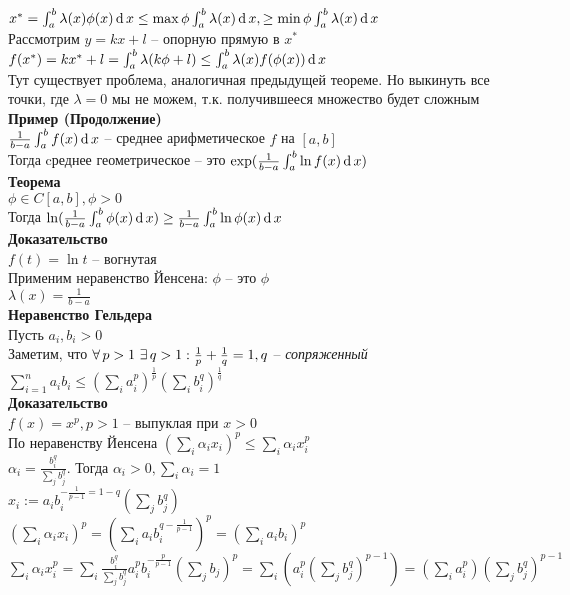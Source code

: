 \documentclass[12pt]{article}
\begin{document}
$x^* = \int_a^b \lambda(x)\phi(x)\operatorname{d} x \leq \max \phi \int_a^b \lambda(x)\operatorname{d} x, \geq \min \phi \int_a^b \lambda(x)\operatorname{d} x$\\
Рассмотрим $y=kx+l$ -- опорную прямую в $x^*$\\
$f(x^*) = kx^*+l = \int_a^b \lambda(k\phi + l) \leq \int_a^b \lambda(x)f(\phi(x)) \operatorname{d} x$\\
Тут существует проблема, аналогичная предыдущей теореме. Но выкинуть все точки, где $\lambda = 0$ мы не можем, т.к. получившееся множество будет сложным\\
\textbf{Пример (Продолжение)}\\
$\frac1{b-a}\int_a^b f(x)\operatorname{d} x$ -- среднее арифметическое $f$ на $[a,b]$\\
Тогда cреднее геометрическое -- это $\exp (\frac1{b-a}\int_a^b \ln f(x) \operatorname{d} x)$\\
\textbf{Теорема}\\
$\phi \in C[a,b], \phi > 0$\\
Тогда $\ln (\frac1{b-a}\int_a^b \phi(x)\operatorname{d} x) \geq \frac1{b-a}\int_a^b \ln \phi(x) \operatorname{d} x$\\
\textbf{Доказательство}\\
$f(t) = \ln t$ -- вогнутая\\
Применим неравенство Йенсена: $\phi$ -- это $\phi$\\
$\lambda(x) = \frac1{b-a}$\\
\textbf{Неравенство Гельдера}\\
Пусть $a_i, b_i > 0$\\
Заметим, что $\forall\, p > 1\ \exists\, q > 1: \frac1p + \frac1q = 1, q$ -- \textit{сопряженный}\\
$\sum_{i=1}^n a_ib_i \leq (\sum_i a_i^p)^{\frac1p}(\sum_i b_i^q)^{\frac1q}$\\
\textbf{Доказательство}\\
$f(x) = x^p, p > 1$ -- выпуклая при $x > 0$\\
По неравенству Йенсена $(\sum_i \alpha_i x_i)^p \leq \sum_i \alpha_i x_i^p$\\
$\alpha_i = \frac{b_i^q}{\sum_j b_j^q}$. Тогда $\alpha_i > 0, \sum_i \alpha_i = 1$\\
$x_i := a_ib_i^{-\frac1{p-1}=1-q} (\sum_j b_j^q)$\\
$(\sum_i \alpha_i x_i)^p = (\sum_i a_i b_i^{q-\frac1{p-1}})^p = (\sum_i a_i b_i)^p$\\
$\sum_i \alpha_ix_i^p = \sum_i \frac{b_i^q}{\sum_j b_j^q} a_i^p b_i^{-\frac{p}{p-1}}(\sum_j b_j)^p = \sum_i (a_i^p (\sum_j b_j^q)^{p-1}) = (\sum_i a_i^p)(\sum_j b_j^q)^{p-1}$\\
\end{document}
